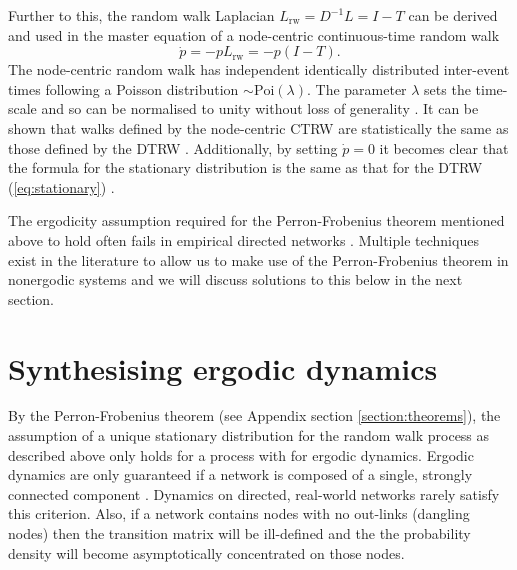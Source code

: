 \documentclass[12pt,a4paper]{article}
\begin{document}
\noindent Further to this, the random walk Laplacian $L_{\text{rw}}= D^{-1}L = I - T$ can be derived and used in the  master equation of a node-centric continuous-time random walk \cite{lambiottenotes}
\begin{equation}
  \dot{p} = -pL_{\text{rw}} = -p (I-T).
\end{equation}
The node-centric random walk has independent identically distributed inter-event times following a Poisson distribution $\sim \text{Poi}(\lambda)$. The parameter $\lambda$ sets the time-scale and so can be normalised to unity without loss of generality \cite{lambiottenotes}. It can be shown that walks defined by the node-centric CTRW are statistically the same as those defined by the DTRW \cite{lambiottenotes}. Additionally, by setting $\dot{p}=0$ it becomes clear that the formula for the stationary distribution is the same as that for the DTRW (\ref{eq:stationary}) \cite{lambiottenotes}.\medskip

\noindent The ergodicity assumption required for the Perron-Frobenius theorem mentioned above to hold often fails in empirical directed networks \cite{lambiottenotes}. Multiple techniques exist in the literature \cite{rosvall2014memory,salnikov2016} to allow us to make use of the Perron-Frobenius theorem in nonergodic systems and we will discuss solutions to this below in the next section.

\section{Synthesising ergodic dynamics}\label{section:ergodic}
By the Perron-Frobenius theorem (see Appendix section \ref{section:theorems}), the assumption of a unique stationary distribution for the random walk process as described above only holds for a process with for ergodic dynamics. Ergodic dynamics are only guaranteed if a network is composed of a single, strongly connected component \cite{lambiottenotes}. Dynamics on directed, real-world networks rarely satisfy this criterion. Also, if a network contains nodes with no out-links (dangling nodes) then the transition matrix will be ill-defined and the the probability density will become asymptotically concentrated on those nodes. \medskip
\end{document}
